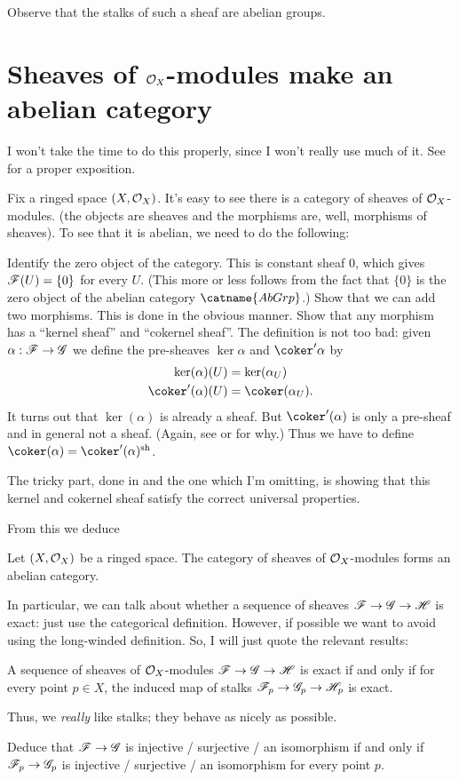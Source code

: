 \documentclass[11pt]{scrreprt}
\begin{document}
Observe that the stalks of such a sheaf are abelian groups.

\section{Sheaves of $\mathcal O_X$-modules make an abelian category}
I won't take the time to do this properly,
since I won't really use much of it.
See \cite{ref:vakil} for a proper exposition.

Fix a ringed space $(X, \mathcal O_X)$.
It's easy to see there is a category of sheaves of $\mathcal O_X$-modules.
(the objects are sheaves and the morphisms are, well, morphisms of sheaves).
To see that it is abelian, we need to do the following:
\begin{itemize}
	\ii Identify the zero object of the category.
	This is constant sheaf $0$, which gives $\mathscr F(U) = \{0\}$ for every $U$.
	(This more or less follows from the fact that $\{0\}$
	is the zero object of the abelian category $\catname{AbGrp}$.)
	\ii Show that we can add two morphisms.
	This is done in the obvious manner.
	\ii Show that any morphism has a ``kernel sheaf'' and ``cokernel sheaf''.
	The definition is not too bad: given $\alpha : \mathscr F \to \mathscr G$ we define the
	pre-sheaves $\ker\alpha$ and $\coker'\alpha$ by
	\begin{align*}
		\ker(\alpha)(U) &= \ker(\alpha_U) \\
		\coker'(\alpha)(U) &= \coker(\alpha_U).
	\end{align*}
	It turns out that $\ker(\alpha)$ is already a sheaf.
	But $\coker'(\alpha)$ is only a pre-sheaf and in general not a sheaf.
	(Again, see \cite{ref:vakil} or \cite{ref:gathmann} for why.)
	Thus we have to define $\coker(\alpha) = \coker'(\alpha) \sh$.
	
	The tricky part, done in \cite{ref:vakil} and the one which I'm omitting,
	is showing that this kernel and cokernel sheaf satisfy
	the correct universal properties.
\end{itemize}

From this we deduce
\begin{theorem}
	Let $(X, \mathcal O_X)$ be a ringed space.
	The category of sheaves of $\mathcal O_X$-modules forms an abelian category.
\end{theorem}

In particular, we can talk about whether a sequence of sheaves
$\mathscr F \to \mathscr G \to \mathscr H$ is exact: just use the categorical definition.
However, if possible we want to avoid using the long-winded definition.
So, I will just quote the relevant results:
\begin{theorem}
	A sequence of sheaves of $\mathcal O_X$-modules
	$\mathscr F \to \mathscr G \to \mathscr H$ is exact if and only if
	for every point $p \in X$,
	the induced map of stalks $\mathscr F_p \to \mathscr G_p \to \mathscr H_p$ is exact.
\end{theorem}
Thus, we \emph{really} like stalks; they behave as nicely as possible.
\begin{ques}
	Deduce that $\mathscr F \to \mathscr G$ is injective / surjective / an isomorphism
	if and only if $\mathscr F_p \to \mathscr G_p$ is injective / surjective / an isomorphism
	for every point $p$.
\end{ques}
\end{document}
